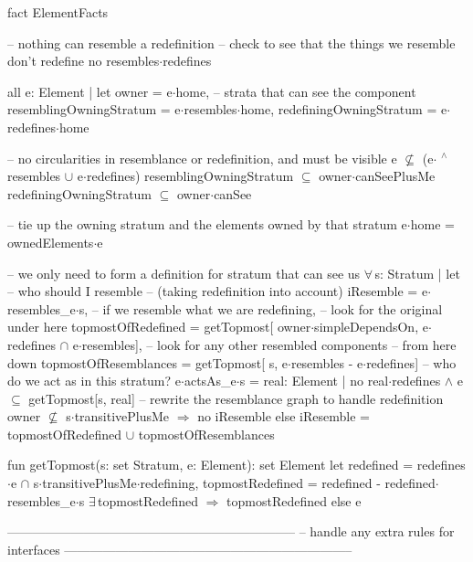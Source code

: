 fact ElementFacts
{
  -- nothing can resemble a redefinition -- check to see that the things we resemble don't redefine
  no resembles$\cdot$redefines
  
  all
    e: Element |
  let
    owner = e$\cdot$home,
    -- strata that can see the component
    resemblingOwningStratum = e$\cdot$resembles$\cdot$home,
    redefiningOwningStratum = e$\cdot$redefines$\cdot$home
  {
    -- no circularities in resemblance or redefinition, and must be visible
    e $\not\subseteq$ (e$\cdot$ $\!\!\!^\wedge\!$resembles $\cup$ e$\cdot$redefines)
    resemblingOwningStratum $\subseteq$ owner$\cdot$canSeePlusMe
    redefiningOwningStratum $\subseteq$ owner$\cdot$canSee
    
    -- tie up the owning stratum and the elements owned by that stratum
    e$\cdot$home = ownedElements$\cdot$e

    -- we only need to form a definition for stratum that can see us
    $\forall\,$s: Stratum |
    let
      -- who should I resemble
      -- (taking redefinition into account)
      iResemble = e$\cdot$resembles_e$\cdot$s,
      -- if we resemble what we are redefining,
      -- look for the original under here
      topmostOfRedefined = getTopmost[
        owner$\cdot$simpleDependsOn,
        e$\cdot$redefines $\cap$ e$\cdot$resembles],
      -- look for any other resembled components
      -- from here down
      topmostOfResemblances = getTopmost[
        s,
        e$\cdot$resembles - e$\cdot$redefines]
    {
      -- who do we act as in this stratum?
      e$\cdot$actsAs_e$\cdot$s =
        { real: Element | no real$\cdot$redefines $\wedge$ e $\subseteq$ getTopmost[s, real] }
      -- rewrite the resemblance graph to handle redefinition
      owner $\not\subseteq$ s$\cdot$transitivePlusMe $\Longrightarrow$
        no iResemble
      else
        iResemble = topmostOfRedefined $\cup$ topmostOfResemblances
    }
  }
}

fun getTopmost(s: set Stratum, e: Element): set Element
{
  let redefined = redefines$\cdot$e $\cap$ s$\cdot$transitivePlusMe$\cdot$redefining,
    topmostRedefined = redefined - redefined$\cdot$resembles_e$\cdot$s
      { $\exists\,$topmostRedefined $\Longrightarrow$ topmostRedefined else e }
}

--------------------------------------------------------------------
-- handle any extra rules for interfaces
--------------------------------------------------------------------

